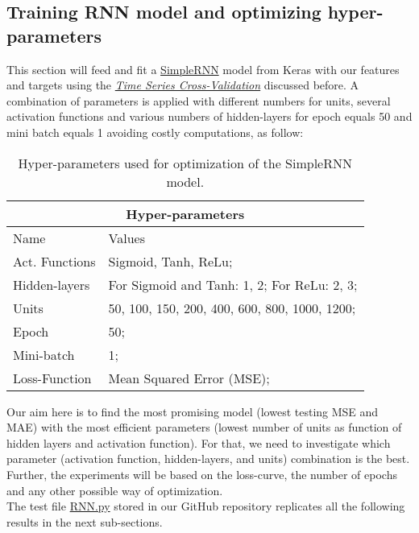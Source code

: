 \subsection{Training RNN model and optimizing hyper-parameters}
\label{chap:Training RNN model and optimizing hyper-parameters}

\quad This section will feed and fit a \href{https://www.tensorflow.org/api_docs/python/tf/keras/layers/SimpleRNN}{SimpleRNN} model from Keras with our features and targets using the \hyperref[chap:Time series Cross-Validation]{\textit{Time Series Cross-Validation}} discussed before. A combination of parameters is applied with different numbers for units, several activation functions and various numbers of hidden-layers for epoch equals 50 and mini batch equals 1 avoiding costly computations, as follow:

\begin{table}[H]
\centering
\begin{tabular}{ |p{2.5cm}||p{7cm}|  }
\hline
\multicolumn{2}{|c|}{Hyper-parameters} \\
\hline
Name & Values\\
\hline
Act. Functions & Sigmoid, Tanh, ReLu;\\
Hidden-layers & For Sigmoid and Tanh: 1, 2; For ReLu: 2, 3;\\
Units & 50, 100, 150, 200, 400, 600, 800, 1000, 1200;\\
Epoch & 50;\\
Mini-batch & 1;\\
Loss-Function & Mean Squared Error (MSE);\\
\hline
\end{tabular}
\label{table:Hyper-parameters for SimpleRNN}
\caption{Hyper-parameters used for optimization of the SimpleRNN model.}
\end{table}

Our aim here is to find the most promising model (lowest testing MSE and MAE) with the most efficient parameters (lowest number of units as function of hidden layers and activation function). For that, we need to investigate which parameter (activation function, hidden-layers, and units) combination is the best. Further, the experiments will be based on the loss-curve, the number of epochs and any other possible way of optimization.\\

The test file \href{https://github.com/fabiorodp/UiO-FYS-STK4155/tree/master/Project3/RNN.py}{RNN.py} stored in our GitHub repository replicates all the following results in the next sub-sections.

